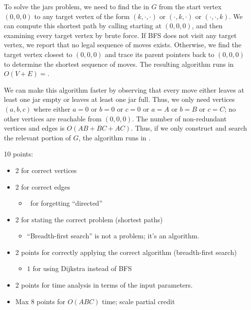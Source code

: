 \documentclass[11pt]{article}
\begin{document}
\begin{enumerate}
\begin{solution}
To solve the jars problem, we need to find the  in $G$ from the start vertex $(0,0,0)$ to any target vertex of the form $(k, \cdot, \cdot)$ or $(\cdot, k, \cdot)$ or $(\cdot,\cdot, k)$.  We can compute this shortest path by calling  starting at $(0,0,0)$, and then examining every target vertex by brute force.  If BFS does not visit any target vertex, we report that no legal sequence of moves exists.  Otherwise, we find the target vertex closest to $(0,0,0)$ and trace its parent pointers back to $(0,0,0)$ to determine the shortest sequence of moves.  The resulting algorithm runs in $O(V+E) ={}$.

We can make this algorithm faster by observing that every move either leaves at least one jar empty or leaves at least one jar full.  Thus, we only need vertices $(a,b,c)$ where either $a=0$ or $b=0$ or $c=0$ or $a=A$ or $b=B$ or $c=C$; no other vertices are reachable from $(0,0,0)$.  The number of non-redundant vertices and edges is $O(AB+BC+AC)$.  Thus, if we only construct and search the relevant portion of $G$, the algorithm runs in .
\end{solution}

\begin{rubric}
10 points:
\begin{itemize}\cramped
\item 2 for correct vertices
\item 2 for correct edges
\begin{itemize}\cramped
\item $\!\!\!$\textonehalf\ for forgetting “directed”
\end{itemize}
\item 2 for stating the correct problem (shortest paths)
\begin{itemize}\cramped
\item “Breadth-first search” is not a problem; it’s an algorithm.
\end{itemize}
\item 2 points for correctly applying the correct algorithm (breadth-first search)
\begin{itemize}\cramped
\item $\!\!\!1$ for using Dijkstra instead of BFS
\end{itemize}
\item 2 points for time analysis in terms of the input parameters.
\item Max 8 points for $O(ABC)$ time; scale partial credit
\end{itemize}
\end{rubric}


\end{enumerate}
\end{document}
